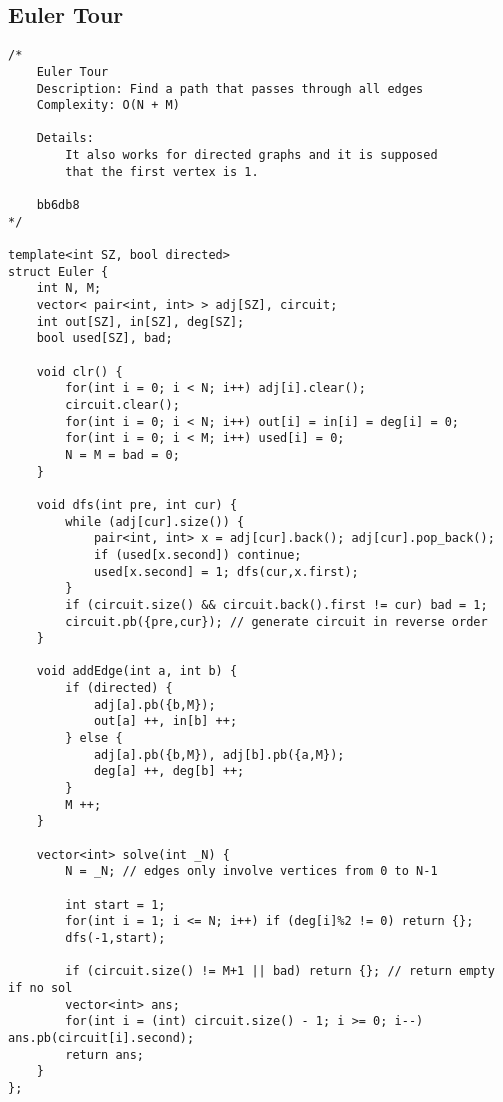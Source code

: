\documentclass{article}
\begin{document}
\subsection{Euler Tour}
\begin{verbatim}
/*
    Euler Tour
    Description: Find a path that passes through all edges
    Complexity: O(N + M)

    Details:
        It also works for directed graphs and it is supposed
        that the first vertex is 1.

    bb6db8
*/

template<int SZ, bool directed> 
struct Euler {
    int N, M;
    vector< pair<int, int> > adj[SZ], circuit;
    int out[SZ], in[SZ], deg[SZ];
    bool used[SZ], bad;
 
    void clr() {
        for(int i = 0; i < N; i++) adj[i].clear();
        circuit.clear();
        for(int i = 0; i < N; i++) out[i] = in[i] = deg[i] = 0;
        for(int i = 0; i < M; i++) used[i] = 0;
        N = M = bad = 0;
    }
 
    void dfs(int pre, int cur) {
        while (adj[cur].size()) {
            pair<int, int> x = adj[cur].back(); adj[cur].pop_back();
            if (used[x.second]) continue;
            used[x.second] = 1; dfs(cur,x.first);
        }
        if (circuit.size() && circuit.back().first != cur) bad = 1;
        circuit.pb({pre,cur}); // generate circuit in reverse order
    }
 
    void addEdge(int a, int b) {
        if (directed) {
            adj[a].pb({b,M});
            out[a] ++, in[b] ++;
        } else {
            adj[a].pb({b,M}), adj[b].pb({a,M});
            deg[a] ++, deg[b] ++;
        }
        M ++;
    }
 
    vector<int> solve(int _N) {
        N = _N; // edges only involve vertices from 0 to N-1
 
        int start = 1; 
        for(int i = 1; i <= N; i++) if (deg[i]%2 != 0) return {};
        dfs(-1,start);
 
        if (circuit.size() != M+1 || bad) return {}; // return empty if no sol
        vector<int> ans; 
        for(int i = (int) circuit.size() - 1; i >= 0; i--) ans.pb(circuit[i].second);
        return ans;
    }
};
\end{verbatim}
\end{document}

